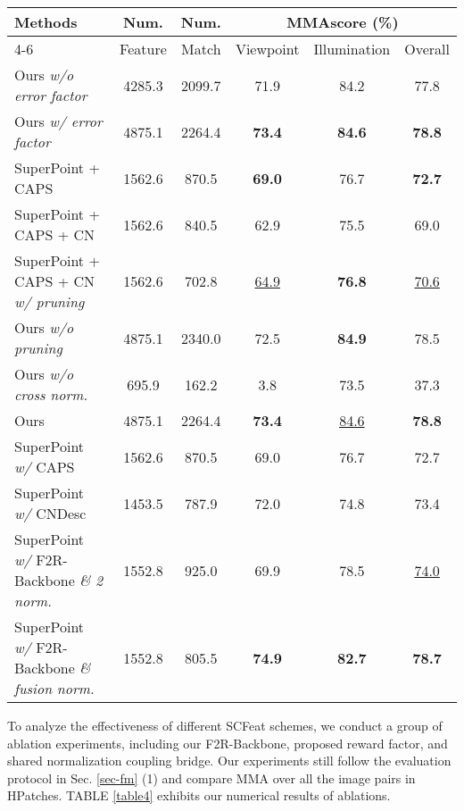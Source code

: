 \documentclass[journal]{IEEEtran}
\begin{document}
\begin{table*}[h]
\centering
\renewcommand\arraystretch{1.5}
\caption{Ablation Comparisons: the MMAscore results achieved by different combination schemes on HPatches \cite{HPatches}. }
{
\begin{tabular}{l|cc|ccc}
    \hline
     \multirow{2}{*}{Methods} & Num. & Num. & \multicolumn{3}{c}{MMAscore (\%)}\\
    \cline{4-6}
            & Feature & Match & Viewpoint & Illumination & Overall  \\
    \hline
    \hline
    Ours \textit{w/o error factor}          & 4285.3 & 2099.7 & 71.9 & 84.2 & 77.8  \\
    Ours \textit{w/ error factor}               & 4875.1 & 2264.4 & \textbf{73.4} & \textbf{84.6} & \textbf{78.8} \\
    \hline
    \hline
    SuperPoint + CAPS \cite{caps}     & 1562.6 & 870.5 & \textbf{69.0} & 76.7 & \textbf{72.7} \\
    SuperPoint + CAPS + CN              & 1562.6 & 840.5 & 62.9 & 75.5 & 69.0 \\
    \hdashline
    SuperPoint + CAPS + CN \textit{w/ pruning}  & 1562.6 & 702.8 & \underline{64.9} & \textbf{76.8} & \underline{70.6} \\
    \hline
    \hline
    Ours \textit{w/o pruning}       & 4875.1 & 2340.0 & 72.5 & \textbf{84.9} & 78.5 \\
    Ours \textit{w/o cross norm.}               & 695.9 & 162.2 & 3.8 & 73.5 & 37.3 \\
    \hdashline
    Ours    & 4875.1 & 2264.4 & \textbf{73.4} & \underline{84.6} & \textbf{78.8} \\
    \hline
    \hline
    SuperPoint \textit{w/} CAPS \cite{caps}       & 1562.6 & 870.5 & 69.0 & 76.7 & 72.7 \\
    SuperPoint \textit{w/} CNDesc \cite{cndesc}              & 1453.5 & 787.9 & 72.0 & 74.8 & 73.4 \\
    \hdashline
    SuperPoint \textit{w/} F2R-Backbone \textit{\& 2 norm.}  & 1552.8 & 925.0 & 69.9 & 78.5 & \underline{74.0} \\
    SuperPoint \textit{w/} F2R-Backbone \textit{\& fusion norm.}   & 1552.8 & 805.5 & \textbf{74.9} & \textbf{82.7} & \textbf{78.7} \\
    \hline
\end{tabular}
}
\label{table4}
\end{table*}

To analyze the effectiveness of different SCFeat schemes, we conduct a group of ablation experiments, including our F2R-Backbone, proposed reward factor, and shared normalization coupling bridge. Our experiments still follow the evaluation protocol in Sec. \ref{sec-fm} (1) and compare MMA over all the image pairs in HPatches. TABLE \ref{table4} exhibits our numerical results of ablations.
\end{document}
